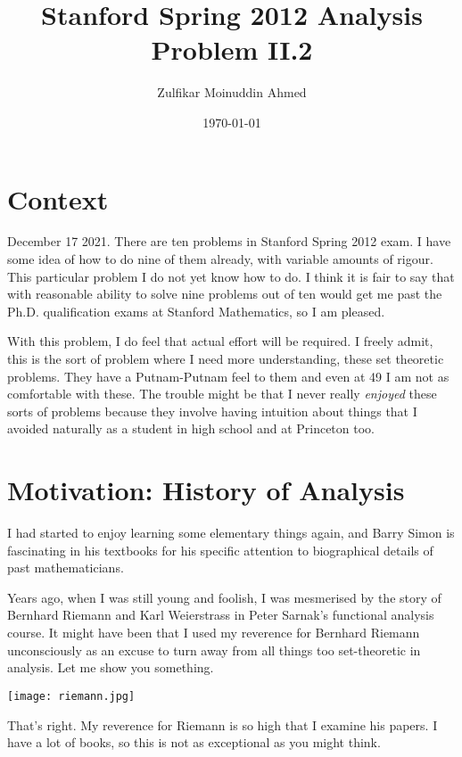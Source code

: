 \documentclass{amsart}
\title{Stanford Spring 2012 Analysis Problem II.2}
\author{Zulfikar Moinuddin Ahmed}
\date{\today}
\begin{document}
\maketitle

\section{Context}

December 17 2021.  There are ten problems in Stanford Spring 2012 exam.  I have some idea of how to do nine of them already, with variable amounts of rigour.  This particular problem I do not yet know how to do.  I think it is fair to say that with reasonable ability to solve nine problems out of ten would get me past the Ph.D. qualification exams at Stanford Mathematics, so I am pleased.

With this problem, I do feel that actual effort will be required.  I freely admit, this is the sort of problem where I need more understanding, these set theoretic problems.  They have a Putnam-Putnam feel to them and even at 49 I am not as comfortable with these.  The trouble might be that I never really {\em enjoyed} these sorts of problems because they involve having intuition about things that I avoided naturally as a student in high school and at Princeton too.

\section{Motivation: History of Analysis}

I had started to enjoy learning some elementary things again, and Barry Simon is fascinating in his textbooks for his specific attention to biographical details of past mathematicians.  

Years ago, when I was still young and foolish, I was mesmerised by the story of Bernhard Riemann and Karl Weierstrass in Peter Sarnak's functional analysis course.    It might have been that I used my reverence for Bernhard Riemann unconsciously as an excuse to turn away from all things too set-theoretic in analysis.  Let me show you something.

\texttt{[image: riemann.jpg]}

That's right.  My reverence for Riemann is so high that I examine his papers.  I have a lot of books, so this is not as exceptional as you might think.
\end{document}
